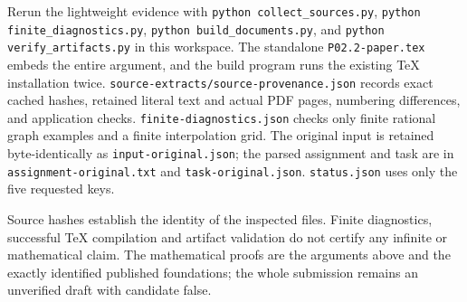\documentclass[11pt]{article}
\begin{document}
Rerun the lightweight evidence with {\small\texttt{python collect\_sources.py}}, {\small\texttt{python finite\_diagnostics.py}}, {\small\texttt{python build\_documents.py}}, and {\small\texttt{python verify\_artifacts.py}} in this workspace. The standalone {\small\texttt{P02.2-paper.tex}} embeds the entire argument, and the build program runs the existing TeX installation twice. {\small\texttt{source-extracts/source-provenance.json}} records exact cached hashes, retained literal text and actual PDF pages, numbering differences, and application checks. {\small\texttt{finite-diagnostics.json}} checks only finite rational graph examples and a finite interpolation grid. The original input is retained byte-identically as {\small\texttt{input-original.json}}; the parsed assignment and task are in {\small\texttt{assignment-original.txt}} and {\small\texttt{task-original.json}}. {\small\texttt{status.json}} uses only the five requested keys.

Source hashes establish the identity of the inspected files. Finite diagnostics, successful TeX compilation and artifact validation do not certify any infinite or mathematical claim. The mathematical proofs are the arguments above and the exactly identified published foundations; the whole submission remains an unverified draft with candidate false.
\end{document}
